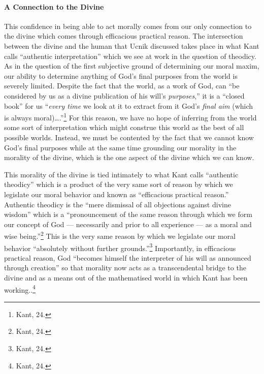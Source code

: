 \documentclass[12pt]{article}
\begin{document}
	\paragraph*{A Connection to the Divine} This confidence in being able to act morally comes from our only connection to the divine which comes through efficacious practical reason. The intersection between the divine and the human that Ucnik discussed takes place in what Kant calls ``authentic interpretation'' which we see at work in the question of theodicy. As in the question of the first subjective ground of determining our moral maxim, our ability to determine anything of God's final purposes from the world is severely limited. Despite the fact that the world, as a work of God, can ``be considered by us as a divine publication of his will's \emph{purposes},'' it is a ``closed book'' for us ``\emph{every time} we look at it to extract from it God's \emph{final aim} (which is always moral)\ldots.''\footnote{Kant, 24.} For this reason, we have no hope of inferring from the world some sort of interpretation which might construe this world as the best of all possible worlds. Instead, we must be contented by the fact that we cannot know God's final purposes while at the same time grounding our morality in the morality of the divine, which is the one aspect of the divine which we can know. 
	
	This morality of the divine is tied intimately to what Kant calls ``authentic theodicy'' which is a product of the very same sort of reason by which we legislate our moral behavior and known as ``efficacious practical reason.'' Authentic theodicy is the ``mere dismissal of all objections against divine wisdom'' which is a ``pronouncement of the same reason through which we form our concept of God --- necessarily and prior to all experience --- as a moral and wise being.''\footnote{Kant, 24.} This is the very same reason by which we legislate our moral behavior ``absolutely without further grounds.''\footnote{Kant, 24.} Importantly, in efficacious practical reason, God ``becomes himself the interpreter of his will as announced through creation'' so that morality now acts as a transcendental bridge to the divine and as a means out of the mathematised world in which Kant has been working..\footnote{Kant, 24.}  
	
\end{document}

